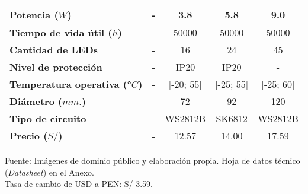 \begin{itemize}
\begin{savenotes}
\begin{mytable}[H]
\begin{tabular}{l|c|c|c|c|}
			\multicolumn{1}{|l|}{
				\begin{minipage}{\myforthmaxsizeofcontenttable}	
					\textbf{Potencia ($W$)}
				\end{minipage}
			} & - & 3.8 & 5.8 & 9.0 \\ \hline
		
			\multicolumn{1}{|l|}{
				\begin{minipage}{\myforthmaxsizeofcontenttable}	
					\textbf{Tiempo de vida útil ($h$)}
				\end{minipage}
			} & - & 50000 & 50000 & 50000 \\ \hline
		
			\multicolumn{1}{|l|}{
				\begin{minipage}{\myforthmaxsizeofcontenttable}	
					\textbf{Cantidad de LEDs}
				\end{minipage}
			} & - & 16 & 24 & 45 \\ \hline
			
			\multicolumn{1}{|l|}{
				\begin{minipage}{\myforthmaxsizeofcontenttable}	
					\textbf{Nivel de protección}
				\end{minipage}
			} & - & IP20 & IP20 & - \\ \hline			
			\multicolumn{1}{|l|}{
				\begin{minipage}{\myforthmaxsizeofcontenttable}	
					\textbf{Temperatura operativa (°$C$)}
				\end{minipage}
			} & - & [-20; 55] & [-25; 55] & [-25; 60] \\ \hline			
			\multicolumn{1}{|l|}{
				\begin{minipage}{\myforthmaxsizeofcontenttable}	
					\textbf{Diámetro ($mm.$)}
				\end{minipage}
			} & - & 72 & 92 & 120 \\ \hline			
			\multicolumn{1}{|l|}{
				\begin{minipage}{\myforthmaxsizeofcontenttable}	
					\textbf{Tipo de circuito}
				\end{minipage}
			} & - & WS2812B & SK6812 & WS2812B \\ \hline			
			\multicolumn{1}{|l|}{
				\begin{minipage}{\myforthmaxsizeofcontenttable}	
					\textbf{Precio ($S/$)}
				\end{minipage}
			} & - & 12.57 & 14.00 & 17.59 \\ \hline
			\end{tabular}
			\begin{flushleft}	
				Fuente: Imágenes de dominio público y elaboración propia. Hoja de datos técnico (\textit{Datasheet}) en el Anexo.\\
				Tasa de cambio de USD a PEN: S/ 3.59.
			\end{flushleft}
		\end{mytable}
	\end{savenotes}


\end{itemize}
